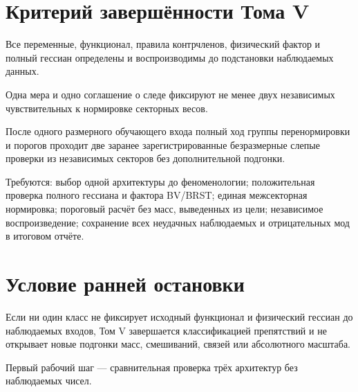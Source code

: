 \section{Критерий завершённости Тома V}

\begin{definition}
Все переменные, функционал, правила контрчленов, физический фактор и полный
гессиан определены и воспроизводимы до подстановки наблюдаемых данных.
\end{definition}

\begin{definition}
Одна мера и одно соглашение о следе фиксируют не менее двух независимых
чувствительных к нормировке секторных весов.
\end{definition}

\begin{definition}
После одного размерного обучающего входа полный ход группы перенормировки и
порогов проходит две заранее зарегистрированные безразмерные слепые проверки
из независимых секторов без дополнительной подгонки.
\end{definition}

\begin{protocol}
Требуются: выбор одной архитектуры до феноменологии; положительная проверка
полного гессиана и фактора BV/BRST; единая межсекторная нормировка;
пороговый расчёт без масс, выведенных из цели; независимое воспроизведение;
сохранение всех неудачных наблюдаемых и отрицательных мод в итоговом отчёте.
\end{protocol}

\section{Условие ранней остановки}

\begin{nogocriterion}
Если ни один класс не фиксирует исходный функционал и физический гессиан до
наблюдаемых входов, Том V завершается классификацией препятствий и не
открывает новые подгонки масс, смешиваний, связей или абсолютного масштаба.
\end{nogocriterion}

Первый рабочий шаг --- сравнительная проверка трёх архитектур без
наблюдаемых чисел.